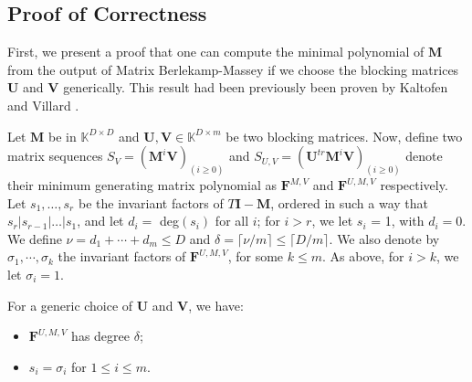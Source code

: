 \documentclass[12pt]{article}
\def\mF{\mathbf{F}}
\def\mI{\mathbf{I}}
\def\mM{\mathbf{M}}
\def\mU{\mathbf{U}}
\def\mV{\mathbf{V}}
\begin{document}
\subsection{Proof of Correctness}

First, we present a proof that one can compute
the minimal polynomial of $\mM$ from the
output of Matrix Berlekamp-Massey if we choose
the blocking matrices $\mU$ and $\mV$ generically.
This result had been previously been proven by
Kaltofen and Villard \cite{KaVi04,Villard97a}.

Let $\mM$ be in $\mathbb{K}^{D \times D}$ and 
$\mU,\mV \in \mathbb{K}^{D \times m}$ be two blocking matrices. Now, define two matrix sequences
$S_V = (\mM^i \mV)_{(i \ge 0)}$ and 
$S_{U,V} = (\mU^{tr} \mM^i \mV)_{(i \ge 0)}$ denote their minimum
generating matrix polynomial as $\mF^{M,V}$ and $\mF^{U,M,V}$ respectively.
Let $s_1, \dots, s_r$ be the invariant factors
of $T\mI - \mM$, ordered in such a way that 
$s_r | s_{r-1}| \dots | s_1$, and let $d_i = $ deg$(s_i)$ for
all $i$; for $i > r$, we let $s_i$ = 1, with $d_i = 0$.
We define $\nu = d_1 + \cdots + d_m \le D$ and
$\delta = \lceil \nu / m \rceil \le \lceil D / m \rceil$.
We also denote by $\sigma_1, \cdots, \sigma_k$ the invariant
factors of $\mF^{U,M,V}$, for some $k \le m$. As above,
for $i > k$, we let $\sigma_i = 1$.

\begin{theorem}
	\label{randXY}
	For a generic choice of $\mU$ and $\mV$, we have:
	\begin{itemize}
		\item $\mF^{U,M,V}$ has degree $\delta$;
		\item $s_i = \sigma_i$ for $1 \le i \le m$.
	\end{itemize}
\end{theorem}
\end{document}

